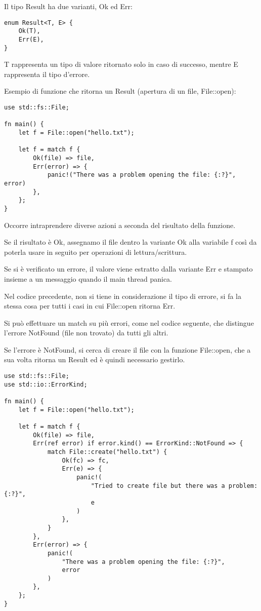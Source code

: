 Il tipo Result ha due varianti, Ok ed Err:

\begin{lstlisting}
enum Result<T, E> {
    Ok(T),
    Err(E),
}
\end{lstlisting}

T rappresenta un tipo di valore ritornato solo in caso di successo, mentre
E rappresenta il tipo d'errore.

Esempio di funzione che ritorna un Result (apertura di un file, File::open):

\begin{lstlisting}
use std::fs::File;

fn main() {
    let f = File::open("hello.txt");

    let f = match f {
        Ok(file) => file,
        Err(error) => {
            panic!("There was a problem opening the file: {:?}", error)
        },
    };
}
\end{lstlisting}

Occorre intraprendere diverse azioni a seconda del risultato della funzione.

Se il risultato è Ok, assegnamo il file dentro la variante Ok alla variabile f
così da poterla usare in seguito per operazioni di lettura/scrittura.

Se si è verificato un errore, il valore viene estratto dalla variante Err e
stampato insieme a un messaggio quando il main thread panica.

Nel codice precedente, non si tiene in considerazione il tipo di errore, si
fa la stessa cosa per tutti i casi in cui File::open ritorna Err.

Si può effettuare un match su più errori, come nel codice seguente, che
distingue l'errore NotFound (file non trovato) da tutti gli altri.

Se l'errore è NotFound, si cerca di creare il file con la funzione File::open,
che a sua volta ritorna un Result ed è quindi necessario gestirlo.

\begin{lstlisting}
use std::fs::File;
use std::io::ErrorKind;

fn main() {
    let f = File::open("hello.txt");

    let f = match f {
        Ok(file) => file,
        Err(ref error) if error.kind() == ErrorKind::NotFound => {
            match File::create("hello.txt") {
                Ok(fc) => fc,
                Err(e) => {
                    panic!(
                        "Tried to create file but there was a problem: {:?}",
                        e
                    )
                },
            }
        },
        Err(error) => {
            panic!(
                "There was a problem opening the file: {:?}",
                error
            )
        },
    };
}
\end{lstlisting}

